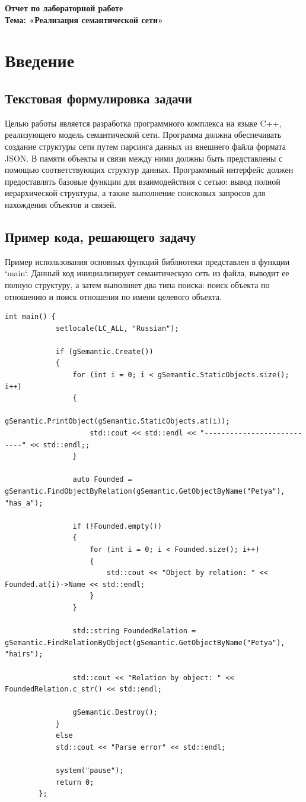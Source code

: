 \documentclass[12pt,a4paper]{scrartcl}
\begin{document}
	\begin{center}
		\large{\textbf{Отчет по лабораторной работе}} \\
		\large{\textbf{Тема: «Реализация семантической сети»}}
	\end{center}
	
	\section{Введение}
	\label{sec:intro}
	
	\subsection{Текстовая формулировка задачи}
	\label{sec:intro:task}
	Целью работы является разработка программного комплекса на языке C++, реализующего модель семантической сети. Программа должна обеспечивать создание структуры сети путем парсинга данных из внешнего файла формата JSON. В памяти объекты и связи между ними должны быть представлены с помощью соответствующих структур данных. Программный интерфейс должен предоставлять базовые функции для взаимодействия с сетью: вывод полной иерархической структуры, а также выполнение поисковых запросов для нахождения объектов и связей.
	
	\subsection{Пример кода, решающего задачу}
	\label{sec:intro:code}
	Пример использования основных функций библиотеки представлен в функции `main`. Данный код инициализирует семантическую сеть из файла, выводит ее полную структуру, а затем выполняет два типа поиска: поиск объекта по отношению и поиск отношения по имени целевого объекта.
	
	\begin{lstlisting}[caption={Пример основной логики приложения}]
		int main() {
			setlocale(LC_ALL, "Russian");
			
			if (gSemantic.Create())
			{
				for (int i = 0; i < gSemantic.StaticObjects.size(); i++)
				{
					gSemantic.PrintObject(gSemantic.StaticObjects.at(i));
					std::cout << std::endl << "---------------------------" << std::endl;;
				}
				
				auto Founded = gSemantic.FindObjectByRelation(gSemantic.GetObjectByName("Petya"), "has_a");
				
				if (!Founded.empty())
				{
					for (int i = 0; i < Founded.size(); i++)
					{
						std::cout << "Object by relation: " << Founded.at(i)->Name << std::endl;
					}
				}
				
				std::string FoundedRelation = gSemantic.FindRelationByObject(gSemantic.GetObjectByName("Petya"), "hairs");
				
				std::cout << "Relation by object: " << FoundedRelation.c_str() << std::endl;
				
				gSemantic.Destroy();
			}
			else
			std::cout << "Parse error" << std::endl;
			
			system("pause");
			return 0;
		};
	\end{lstlisting}
	
\end{document}
